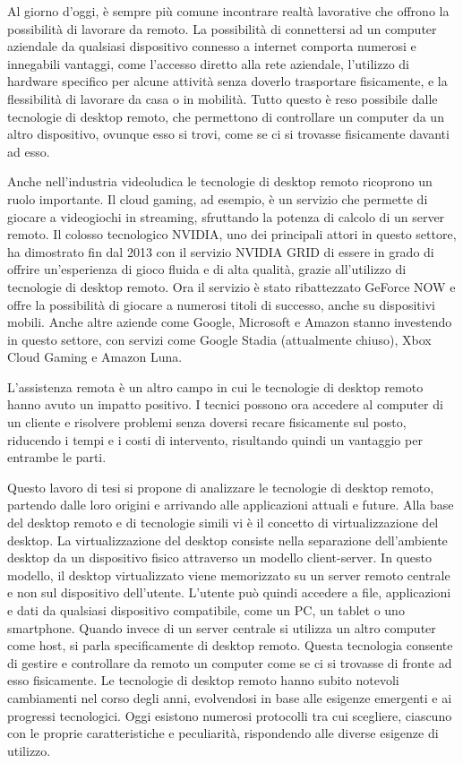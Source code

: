 \documentclass[12pt,a4paper,openright,twoside]{book}
\begin{document}
Al giorno d'oggi, è sempre più comune incontrare realtà lavorative che offrono la possibilità di lavorare da remoto.
%
La possibilità di connettersi ad un computer aziendale da qualsiasi dispositivo connesso a internet comporta numerosi e innegabili vantaggi,
come l'accesso diretto alla rete aziendale,
l'utilizzo di hardware specifico per alcune attività senza doverlo trasportare fisicamente,
e la flessibilità di lavorare da casa o in mobilità.
%
Tutto questo è reso possibile dalle tecnologie di desktop remoto, che permettono di controllare un computer da un altro dispositivo, ovunque esso si trovi, come se ci si trovasse fisicamente davanti ad esso.

Anche nell'industria videoludica le tecnologie di desktop remoto ricoprono un ruolo importante.
%
Il cloud gaming,
ad esempio, è un servizio che permette di giocare a videogiochi in streaming,
sfruttando la potenza di calcolo di un server remoto.
%
Il colosso tecnologico NVIDIA,
uno dei principali attori in questo settore,
ha dimostrato fin dal 2013 con il servizio NVIDIA GRID di essere in grado di offrire un'esperienza di gioco fluida e di alta qualità,
grazie all'utilizzo di tecnologie di desktop remoto.
%
Ora il servizio è stato ribattezzato GeForce NOW e offre la possibilità di giocare a numerosi titoli di successo,
anche su dispositivi mobili.
%
Anche altre aziende come Google,
Microsoft e Amazon stanno investendo in questo settore,
con servizi come Google Stadia (attualmente chiuso),
Xbox Cloud Gaming e Amazon Luna.

L'assistenza remota è un altro campo in cui le tecnologie di desktop remoto hanno avuto un impatto positivo.
%
I tecnici possono ora accedere al computer di un cliente e risolvere problemi senza doversi recare fisicamente sul posto,
riducendo i tempi e i costi di intervento,
risultando quindi un vantaggio per entrambe le parti.

Questo lavoro di tesi si propone di analizzare le tecnologie di desktop remoto,
partendo dalle loro origini e arrivando alle applicazioni attuali e future.
%
Alla base del desktop remoto e di tecnologie simili vi è il concetto di virtualizzazione del desktop.
La virtualizzazione del desktop consiste nella separazione dell'ambiente desktop da un dispositivo fisico attraverso un modello client-server.
In questo modello, il desktop virtualizzato viene memorizzato su un server remoto centrale e non sul dispositivo dell'utente.
L'utente può quindi accedere a file,
applicazioni e dati da qualsiasi dispositivo compatibile,
come un \ac{PC},
un tablet o uno smartphone. %
Quando invece di un server centrale si utilizza un altro computer come host,
si parla specificamente di desktop remoto.
Questa tecnologia consente di gestire e controllare da remoto un computer come se ci si trovasse di fronte ad esso fisicamente.
%
Le tecnologie di desktop remoto hanno subito notevoli cambiamenti nel corso degli anni,
evolvendosi in base alle esigenze emergenti e ai progressi tecnologici.
%
Oggi esistono numerosi protocolli tra cui scegliere,
ciascuno con le proprie caratteristiche e peculiarità,
rispondendo alle diverse esigenze di utilizzo.
\end{document}
